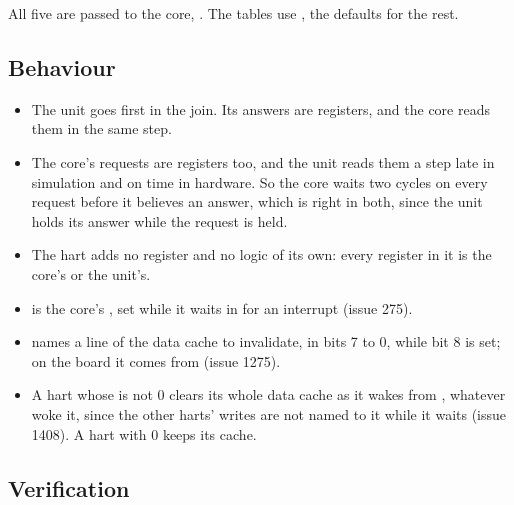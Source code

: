 All five are passed to the core, . The tables use , the defaults for the rest.


\subsection*{Behaviour}

\begin{itemize}
\item The unit goes first in the join. Its answers are registers, and
the core reads them in the same step.
\item The core's requests are registers too, and the unit reads them a
step late in simulation and on time in hardware. So the core waits two
cycles on every request before it believes an answer, which is right
in both, since the unit holds its answer while the request is held.
\item The hart adds no register and no logic of its own: every
register in it is the core's or the unit's.
\item {} is the core's , set while it waits
in  for an interrupt (issue 275).
\item {} names a line of the data cache to invalidate, in
bits 7 to 0, while bit 8 is set; on the board it comes from
 (issue 1275).
\item A hart whose  is not 0 clears its whole data cache as
it wakes from , whatever woke it, since the other harts'
writes are not named to it while it waits (issue 1408). A hart with
 0 keeps its cache.
\end{itemize}

\subsection*{Verification}

